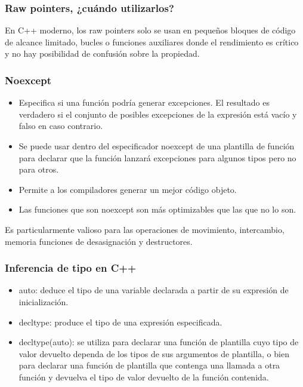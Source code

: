 \documentclass{beamer}
\begin{document}
	\begin{frame}
		\frametitle{Raw pointers, ¿cu\'ando utilizarlos?}
		En C++ moderno, los raw pointers solo se usan en pequeños bloques de código de alcance limitado, bucles o funciones auxiliares donde el rendimiento es crítico y no hay posibilidad de confusión sobre la propiedad.
	\end{frame}


	\begin{frame}
		\frametitle{Noexcept}
		\begin{itemize}
			\item Especifica si una función podría generar excepciones. El resultado es verdadero si el conjunto de posibles excepciones de la expresión está vacío y falso en caso contrario.
			
			\item  Se puede usar dentro del especificador noexcept de una plantilla de función para declarar que la función lanzará excepciones para algunos tipos pero no para otros.
			
			\item Permite a los compiladores generar un mejor código objeto.
			
			\item Las funciones que son noexcept son más optimizables que las que no lo son.
		\end{itemize}

		Es particularmente valioso para las operaciones de movimiento, intercambio, memoria funciones de desasignación y destructores.
	\end{frame}

	\begin{frame}
		\frametitle{Inferencia de tipo en C++}
		\begin{itemize}
			\item auto: deduce el tipo de una variable declarada a partir de su expresión de inicialización.
			\item decltype: produce el tipo de una expresión especificada.
			\item decltype(auto): se utiliza para declarar una función de plantilla cuyo tipo de valor devuelto dependa de los tipos de sus argumentos de plantilla, o bien para declarar una función de plantilla que contenga una llamada a otra función y devuelva el tipo de valor devuelto de la función contenida.
		\end{itemize}
	\end{frame}

\end{document}
